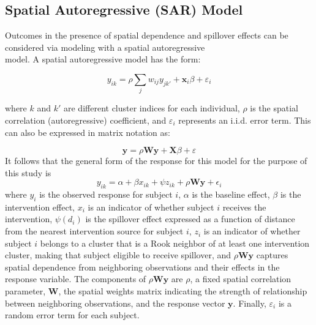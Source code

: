 \documentclass{article}[11pt]
\begin{document}
\subsection{Spatial Autoregressive (SAR) Model}\label{section:SAR}

Outcomes in the presence of spatial dependence and spillover effects can be considered via modeling with a spatial autoregressive\\ model\cite{waller_applied_2004}\cite{fotheringham_sage_2009}\cite{ullah_handbook_1998}. A spatial autoregressive model has the form:

\begin{equation}\label{Equation:SARmodel}
    y_{ik} = \rho\sum_j w_{ij}y_{jk'} + \mathbf{x}_i \beta + \varepsilon_i
\end{equation}

\noindent where $k$ and $k'$ are different cluster indices for each individual, $\rho$ is the spatial correlation (autoregressive) coefficient, and $\varepsilon_i$ represents an i.i.d. error term. This can also be expressed in matrix notation as:

\begin{equation}
    \mathbf{y} = \rho\mathbf{Wy}+\mathbf{X}\beta + \varepsilon
\end{equation}
It follows that the general form of the response for this model for the purpose of this study is
\begin{equation}
    y_{ik} = \alpha + \beta x_{ik} + \psi z_{ik} + \rho\mathbf{Wy} + \epsilon_i
\end{equation}
where $y_i$ is the observed response for subject $i$, $\alpha$ is the baseline effect, $\beta$ is the intervention effect, $x_i$ is an indicator of whether subject $i$ receives the intervention, $\psi(d_i)$ is the spillover effect expressed as a function of distance from the nearest intervention source for subject $i$, $z_i$ is an indicator of whether subject $i$ belongs to a cluster that is a Rook neighbor of at least one intervention cluster, making that subject eligible to receive spillover, and $\rho\mathbf{Wy}$ captures spatial dependence from neighboring observations and their effects in the response variable. The components of $\rho\mathbf{Wy}$ are $\rho$, a fixed spatial correlation parameter, $\mathbf{W}$, the spatial weights matrix indicating the strength of relationship between neighboring observations, and the response vector $\mathbf{y}$. Finally, $\varepsilon_i$ is a random error term for each subject.
\end{document}
